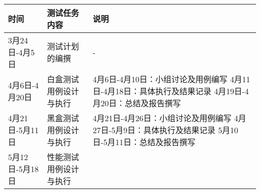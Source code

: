 \documentclass[hyperref, a4paper]{ctexart}
\begin{document}
\begin{longtable}[]{@{}lll@{}}
\toprule
\begin{minipage}[b]{0.13\columnwidth}\raggedright
时间\strut
\end{minipage} & \begin{minipage}[b]{0.28\columnwidth}\raggedright
测试任务内容\strut
\end{minipage} & \begin{minipage}[b]{0.50\columnwidth}\raggedright
说明\strut
\end{minipage}\tabularnewline
\midrule
\endhead
\begin{minipage}[t]{0.13\columnwidth}\raggedright
3月24日-4月5日\strut
\end{minipage} & \begin{minipage}[t]{0.28\columnwidth}\raggedright
测试计划的编撰\strut
\end{minipage} & \begin{minipage}[t]{0.50\columnwidth}\raggedright
-\strut
\end{minipage}\tabularnewline
\begin{minipage}[t]{0.13\columnwidth}\raggedright
4月6日-4月20日\strut
\end{minipage} & \begin{minipage}[t]{0.28\columnwidth}\raggedright
白盒测试用例设计与执行\strut
\end{minipage} & \begin{minipage}[t]{0.50\columnwidth}\raggedright
4月6日-4月10日：小组讨论及用例编写 4月11日-4月18日：具体执行及结果记录
4月19日-4月20日：总结及报告撰写\strut
\end{minipage}\tabularnewline
\begin{minipage}[t]{0.13\columnwidth}\raggedright
4月21日-5月11日\strut
\end{minipage} & \begin{minipage}[t]{0.28\columnwidth}\raggedright
黑盒测试用例设计与执行\strut
\end{minipage} & \begin{minipage}[t]{0.50\columnwidth}\raggedright
4月21日-4月26日：小组讨论及用例编写 4月27日-5月9日：具体执行及结果记录
5月10日-5月11日：总结及报告撰写\strut
\end{minipage}\tabularnewline
\begin{minipage}[t]{0.13\columnwidth}\raggedright
5月12日-5月18日\strut
\end{minipage} & \begin{minipage}[t]{0.28\columnwidth}\raggedright
性能测试用例设计与执行\strut

\end{minipage}
\end{longtable}
\end{document}
